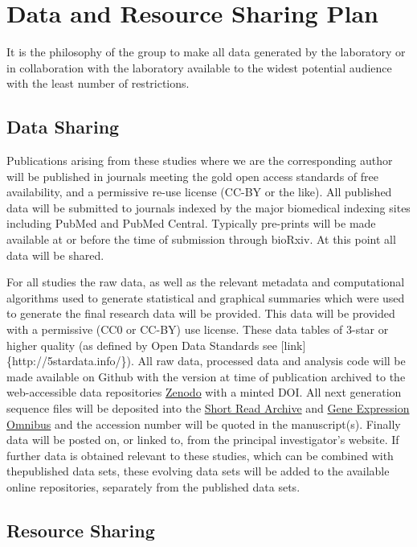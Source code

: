 \section{Data and Resource Sharing
Plan}\label{data-and-resource-sharing-plan}

It is the philosophy of the group to make all data generated by the
laboratory or in collaboration with the laboratory available to the
widest potential audience with the least number of restrictions.

\subsection{Data Sharing}\label{data-sharing}

Publications arising from these studies where we are the corresponding
author will be published in journals meeting the gold open access
standards of free availability, and a permissive re-use license (CC-BY
or the like). All published data will be submitted to journals indexed
by the major biomedical indexing sites including PubMed and PubMed
Central. Typically pre-prints will be made available at or before the
time of submission through bioRxiv. At this point all data will be
shared.

For all studies the raw data, as well as the relevant metadata and
computational algorithms used to generate statistical and graphical
summaries which were used to generate the final research data will be
provided. This data will be provided with a permissive (CC0 or CC-BY)
use license. These data tables of 3-star or higher quality (as defined
by Open Data Standards see {[}link{]}\{http://5stardata.info/\}). All
raw data, processed data and analysis code will be made available on
Github with the version at time of publication archived to the
web-accessible data repositories \href{http://zenodo.com}{Zenodo} with a
minted DOI. All next generation sequence files will be deposited into
the \href{https://www.ncbi.nlm.nih.gov/sra}{Short Read Archive} and
\href{http://http://www.ncbi.nlm.nih.gov/geo/\%7D}{Gene Expression
Omnibus} and the accession number will be quoted in the manuscript(s).
Finally data will be posted on, or linked to, from the principal
investigator's website. If further data is obtained relevant to these
studies, which can be combined with thepublished data sets, these
evolving data sets will be added to the available online repositories,
separately from the published data sets.

\subsection{Resource Sharing}\label{resource-sharing}

